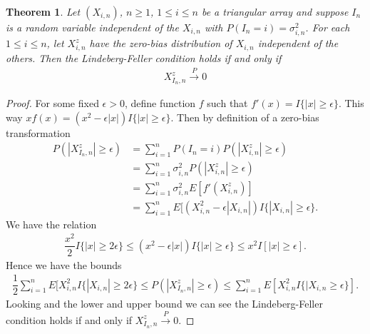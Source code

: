 \documentclass[11pt]{article}
\newcommand{\inp}{\overset{P}{\to}}
\newtheorem{theorem}{Theorem}
\begin{document}
\begin{flushleft}
\begin{theorem}
Let $(X_{i,n})$, $n \geq 1$, $1 \leq i \leq n$ be a triangular array
and suppose $I_n$ is a random variable independent of the $X_{i,n}$ with $P(I_n = i) = \sigma_{i,n}^2$.
For each $1 \leq i \leq n$, let $X_{i,n}^z$ have the zero-bias distribution of $X_{i,n}$ independent of the others.
Then the Lindeberg-Feller condition holds if and only if
\begin{align*}
X_{I_n,n}^z \inp 0
\end{align*}
\end{theorem}
\begin{proof}
For some fixed $\epsilon > 0$, define function $f$ such that $f'(x) = I\{|x| \geq \epsilon\}$. This way $xf(x) = (x^2 - \epsilon|x|) I\{|x| \geq \epsilon\}$.
Then by definition of a zero-bias transformation
\begin{align*}
P(|X_{I_n,n}^z| \geq \epsilon) &= \sum_{i=1}^{n} P(I_n = i) P(|X_{i,n}^z| \geq \epsilon)\\
&=\sum_{i=1}^{n} \sigma_{i,n}^2 P(|X_{i,n}^z| \geq \epsilon)\\
&= \sum_{i=1}^{n} \sigma_{i,n}^2 E[f'(X_{i,n}^z)]\\
&= \sum_{i=1}^{n} E[(X_{i,n}^2 - \epsilon|X_{i,n}|)I\{|X_{i,n}| \geq \epsilon\}.
\end{align*}
We have the relation
\begin{align*}
\dfrac{x^2}{2} I\{|x| \geq 2\epsilon\} \leq (x^2 - \epsilon|x|)I\{|x| \geq \epsilon\} \leq x^2 I[|x| \geq \epsilon].
\end{align*}
Hence we have the bounds
\begin{align*}
\dfrac{1}{2} \sum_{i=1}^{n} E[X_{i,n}^2 I\{|X_{i,n}| \geq 2\epsilon\} \leq P(|X_{I_n,n}^z| \geq \epsilon) \leq \sum_{i=1}^{n} E[X_{i,n}^2I\{|X_{i,n}\geq \epsilon\}].
\end{align*}
Looking and the lower and upper bound we can see the Lindeberg-Feller condition holds if and only if $X_{I_n,n}^z \inp 0$.
\end{proof}


\end{flushleft}
\end{document}
